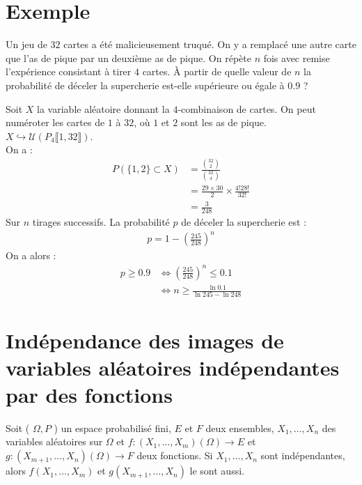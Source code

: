 \documentclass[../main.tex]{subfiles}
\begin{document}
\section{Exemple}
\begin{tcolorbox}[title=Exemple 32.54, title filled=false, colframe=darkgreen, colback=darkgreen!10!white]
    Un jeu de $32$ cartes a été malicieusement truqué. On y a remplacé une autre carte que l'as de pique par un deuxième as de pique. On répète $n$ fois avec remise l'expérience consistant à tirer $4$ cartes. À partir de quelle valeur de $n$ la probabilité de déceler la supercherie est-elle supérieure ou égale à $0.9$ ?
\end{tcolorbox}

\noindent Soit $X$ la variable aléatoire donnant la $4$-combinaison de cartes. On peut numéroter les cartes de $1$ à $32$, où $1$ et $2$ sont les as de pique. \\
$X\hookrightarrow \mathcal{U}(P_4 \llbracket 1, 32 \rrbracket)$. \\
On a :
\begin{align*}
    P(\{ 1, 2 \}\subset X) &= \frac{\binom{32}{2}}{\binom{32}{4}} \\
    &= \frac{29\times 30}{2} \times \frac{4!28!}{32!} \\
    &= \frac{3}{248}
\end{align*}
Sur $n$ tirages successifs. La probabilité $p$ de déceler la supercherie est : 
\begin{align*}
    p = 1 - \left(\frac{245}{248}\right)^n
\end{align*}
On a alors : 
\begin{align*}
    p \geq 0.9 &\Leftrightarrow \left(\frac{245}{248}\right)^n \leq 0.1 \\
    &\Leftrightarrow n \geq \frac{\ln 0.1}{\ln 245 - \ln 248}
\end{align*}

\section{Indépendance des images de variables aléatoires indépendantes par des fonctions}
\begin{tcolorbox}[title=Théorème 32.55, title filled=false, colframe=orange, colback=orange!10!white]
    Soit ( $\Omega, P$ ) un espace probabilisé fini, $E$ et $F$ deux ensembles, $X_1, \ldots, X_n$ des variables aléatoires sur $\Omega$ et $f:\left(X_1, \ldots, X_m\right)(\Omega) \rightarrow E$ et $g:\left(X_{m+1}, \ldots, X_n\right)(\Omega) \rightarrow F$ deux fonctions. Si $X_1, \ldots, X_n$ sont indépendantes, alors $f\left(X_1, \ldots, X_m\right)$ et $g\left(X_{m+1}, \ldots, X_n\right)$ le sont aussi. 
\end{tcolorbox}
\end{document}
